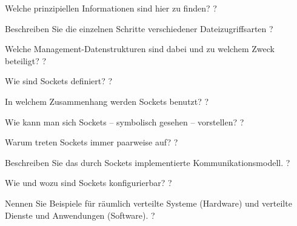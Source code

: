 \documentclass[avery5371]{flashcards}
\begin{document}
\begin{flashcard}[Dateisysteme]{Welche prinzipiellen Informationen sind hier zu finden?}
    ?
\end{flashcard}

\begin{flashcard}[Dateisysteme]{Beschreiben Sie die einzelnen Schritte verschiedener Dateizugriffsarten}
    ?
\end{flashcard}

\begin{flashcard}[Dateisysteme]{Welche Management-Datenstrukturen sind dabei und zu welchem Zweck beteiligt?}
    ?
\end{flashcard}

\begin{flashcard}[Netzwerkmanagement]{Wie sind Sockets definiert?}
    ?
\end{flashcard}

\begin{flashcard}[Netzwerkmanagement]{In welchem Zusammenhang werden Sockets benutzt?}
    ?
\end{flashcard}

\begin{flashcard}[Netzwerkmanagement]{Wie kann man sich Sockets – symbolisch gesehen – vorstellen?}
    ?
\end{flashcard}

\begin{flashcard}[Netzwerkmanagement]{Warum treten Sockets immer paarweise auf?}
    ?
\end{flashcard}

\begin{flashcard}[Netzwerkmanagement]{Beschreiben Sie das durch Sockets implementierte Kommunikationsmodell. }
    ?
\end{flashcard}

\begin{flashcard}[Netzwerkmanagement]{Wie und wozu sind Sockets konfigurierbar? }
    ?
\end{flashcard}

\begin{flashcard}[Netzwerkmanagement]{Nennen Sie Beispiele für räumlich verteilte Systeme (Hardware) und verteilte Dienste und Anwendungen (Software).}
    ?
\end{flashcard}
\end{document}
